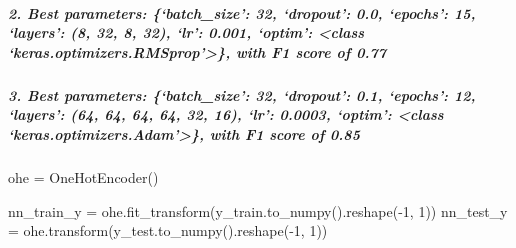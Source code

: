 \documentclass[]{article}
\newenvironment{Shaded}{}{}
\newcommand{\DecValTok}[1]{\textcolor[rgb]{0.25,0.63,0.44}{#1}}
\newcommand{\NormalTok}[1]{#1}
\newcommand{\OperatorTok}[1]{\textcolor[rgb]{0.40,0.40,0.40}{#1}}
\let\oldsubparagraph\subparagraph
\renewcommand{\subparagraph}[1]{\oldsubparagraph{#1}\mbox{}}
\begin{document}
\hypertarget{best-parameters-batch_size-32-dropout-0.0-epochs-15-layers-8-32-8-32-lr-0.001-optim-class-keras.optimizers.rmsprop-with-f1-score-of-0.77}{%
\subparagraph{2. Best parameters: \{`batch\_size': 32, `dropout': 0.0,
`epochs': 15, `layers': (8, 32, 8, 32), `lr': 0.001, `optim':
\textless{}class `keras.optimizers.RMSprop'\textgreater{}\}, with F1
score of
0.77}\label{best-parameters-batch_size-32-dropout-0.0-epochs-15-layers-8-32-8-32-lr-0.001-optim-class-keras.optimizers.rmsprop-with-f1-score-of-0.77}}

\hypertarget{best-parameters-batch_size-32-dropout-0.1-epochs-12-layers-64-64-64-64-32-16-lr-0.0003-optim-class-keras.optimizers.adam-with-f1-score-of-0.85}{%
\subparagraph{3. Best parameters: \{`batch\_size': 32, `dropout': 0.1,
`epochs': 12, `layers': (64, 64, 64, 64, 32, 16), `lr': 0.0003, `optim':
\textless{}class `keras.optimizers.Adam'\textgreater{}\}, with F1 score
of
0.85}\label{best-parameters-batch_size-32-dropout-0.1-epochs-12-layers-64-64-64-64-32-16-lr-0.0003-optim-class-keras.optimizers.adam-with-f1-score-of-0.85}}

\begin{Shaded}
\begin{Highlighting}[]
\NormalTok{ohe }\OperatorTok{=}\NormalTok{ OneHotEncoder()}

\NormalTok{nn_train_y }\OperatorTok{=}\NormalTok{ ohe.fit_transform(y_train.to_numpy().reshape(}\OperatorTok{-}\DecValTok{1}\NormalTok{, }\DecValTok{1}\NormalTok{))}
\NormalTok{nn_test_y }\OperatorTok{=}\NormalTok{ ohe.transform(y_test.to_numpy().reshape(}\OperatorTok{-}\DecValTok{1}\NormalTok{, }\DecValTok{1}\NormalTok{))}
\end{Highlighting}
\end{Shaded}
\end{document}
